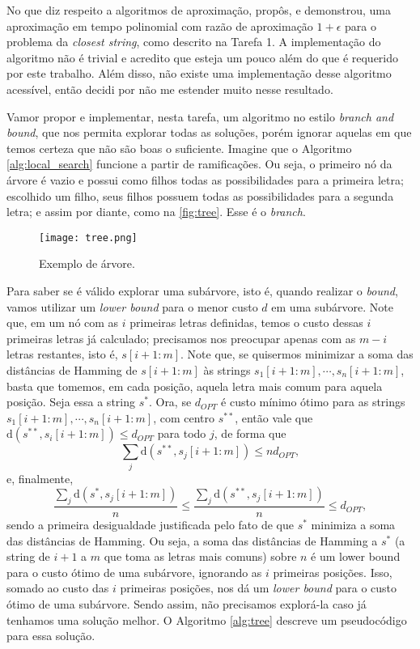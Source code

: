 No que diz respeito a algoritmos de aproximação, \cite{li2002closest} propôs, e demonstrou, uma aproximação em tempo polinomial com razão de aproximação $1 + \epsilon$ para o problema da \textit{closest string}, como descrito na Tarefa 1.
A implementação do algoritmo não é trivial e acredito que esteja um pouco além do que é requerido por este trabalho. Além disso, não existe uma implementação desse algoritmo acessível, então decidi por não me estender muito nesse resultado.

Vamor propor e implementar, nesta tarefa, um algoritmo no estilo \textit{branch and bound}, que nos permita explorar todas as soluções, porém ignorar aquelas em que temos certeza que não são boas o suficiente. Imagine que o Algoritmo \ref{alg:local_search} funcione a partir de ramificações. Ou seja, o primeiro nó da árvore é vazio e possui como filhos todas as possibilidades para a primeira letra; escolhido um filho, seus filhos possuem todas as possibilidades para a segunda letra; e assim por diante, como na \autoref{fig:tree}. Esse é o \textit{branch}.

\begin{figure}[!h]
    \centering
    \texttt{[image: tree.png]}
    \caption{Exemplo de árvore.}
    \label{fig:tree}
\end{figure}

Para saber se é válido explorar uma subárvore, isto é, quando realizar o \textit{bound}, vamos utilizar um \textit{lower bound} para o menor custo $d$ em uma subárvore. Note que, em um nó com as $i$ primeiras letras definidas, temos o custo dessas $i$ primeiras letras já calculado; precisamos nos preocupar apenas com as $m-i$ letras restantes, isto é, $s[i+1:m]$. Note que, se quisermos minimizar a soma das distâncias de Hamming de $s[i+1:m]$ às strings $s_1[i+1:m], \cdots, s_n[i+1:m]$, basta que tomemos, em cada posição, aquela letra mais comum para aquela posição. Seja essa a string $s^\ast$. Ora, se $d_{OPT}$ é custo mínimo ótimo para as strings $s_1[i+1:m], \cdots, s_n[i+1:m]$, com centro $s^{\ast\ast}$, então vale que $\text{d}(s^{\ast\ast}, s_i[i+1:m]) \le d_{OPT}$ para todo $j$, de forma que
\[\sum_j \text{d}(s^{\ast\ast}, s_j[i+1:m]) \le n d_{OPT},\]
e, finalmente,
\[\frac{\sum_j \text{d}(s^{\ast}, s_j[i+1:m])}{n} \le \frac{\sum_j \text{d}(s^{\ast\ast}, s_j[i+1:m])}{n} \le d_{OPT},\]
sendo a primeira desigualdade justificada pelo fato de que $s^\ast$ minimiza a soma das distâncias de Hamming.
Ou seja, a soma das distâncias de Hamming a $s^\ast$ (a string de $i+1$ a $m$ que toma as letras mais comuns) sobre $n$ é um lower bound para o custo ótimo de uma subárvore, ignorando as $i$ primeiras posições. Isso, somado ao custo das $i$ primeiras posições, nos dá um \textit{lower bound} para o custo ótimo de uma subárvore. Sendo assim, não precisamos explorá-la caso já tenhamos uma solução melhor.
O Algoritmo \ref{alg:tree} descreve um pseudocódigo para essa solução.

